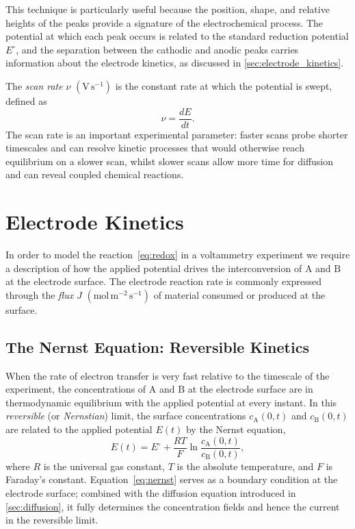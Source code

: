 This technique is particularly useful because the position, shape, and
relative heights of the peaks provide a signature of the
electrochemical process. The potential at which each peak occurs is related
to the standard reduction potential $E^{\circ}$, and the separation between
the cathodic and anodic peaks carries information about the electrode
kinetics, as discussed in \autoref{sec:electrode_kinetics}.

The \emph{scan rate} $\nu$ $(\mathrm{V\,s^{-1}})$ is the constant rate at
which the potential is swept, defined as
\begin{equation}
  \nu = \frac{dE}{dt}.
\end{equation}
The scan rate is an important experimental parameter: faster scans probe
shorter timescales and can resolve kinetic processes that would otherwise
reach equilibrium on a slower scan, whilst slower scans allow more time for
diffusion and can reveal coupled chemical reactions.

\section{Electrode Kinetics}\label{sec:electrode_kinetics}

In order to model the reaction~\eqref{eq:redox} in a voltammetry
experiment we require a description of how the applied potential drives
the interconversion of $\mathrm{A}$ and $\mathrm{B}$ at the electrode
surface. The electrode reaction rate is commonly expressed through the
\emph{flux} $J$ $(\mathrm{mol\,m^{-2}\,s^{-1}})$ of material consumed or
produced at the surface.

\subsection{The Nernst Equation: Reversible Kinetics}

When the rate of electron transfer is very fast relative to the timescale
of the experiment, the concentrations of $\mathrm{A}$ and $\mathrm{B}$ at
the electrode surface are in thermodynamic equilibrium with the applied
potential at every instant. In this \emph{reversible} (or
\emph{Nernstian}) limit, the surface concentrations $c_{\mathrm{A}}(0,t)$
and $c_{\mathrm{B}}(0,t)$ are related to the applied potential $E(t)$ by
the Nernst equation,
\begin{equation}\label{eq:nernst}
  E(t) = E^{\circ} + \frac{RT}{F}
  \ln\frac{c_{\mathrm{A}}(0,t)}{c_{\mathrm{B}}(0,t)},
\end{equation}
where $R$ is the universal gas constant, $T$ is the absolute temperature,
and $F$ is Faraday's constant. Equation~\eqref{eq:nernst} serves as a
boundary condition at the electrode surface; combined with the diffusion
equation introduced in \autoref{sec:diffusion}, it fully determines the
concentration fields and hence the current in the reversible limit.

